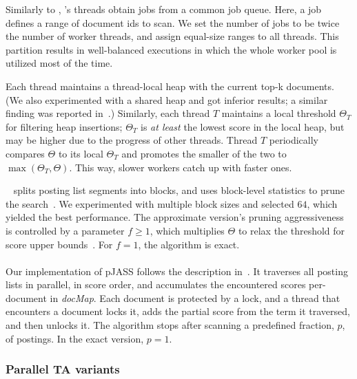 {Similarly to \alg, \pBMW's threads obtain jobs from a common job queue. Here, a job defines a range of document ids to scan. 
We set the number of jobs to be twice the number of worker threads, and assign equal-size ranges to all threads.  
This partition results in well-balanced executions in which the whole worker pool is utilized 
most of the time. 

Each thread maintains a thread-local heap with the current top-k documents. (We also experimented with a shared heap and 
got inferior results; a similar finding was reported in~\cite{rojas2013distributing}.)
Similarly, each thread $T$ maintains a local threshold $\Theta_T$ for filtering heap insertions; 
$\Theta_T$ is \emph{at least} the lowest score in the local heap, but may be higher due to the progress of other threads.  
Thread $T$ periodically compares $\Theta$ to its local $\Theta_T$ and promotes the smaller of the two to $\max(\Theta_T, \Theta)$. 
This way,  slower workers catch up with  faster ones.

\pBMW\
splits posting list segments into blocks, and uses block-level
statistics to prune the search~\cite{Ding:2011}. We experimented with multiple block sizes and selected $64$, 
which yielded the best performance.
The approximate version's pruning aggressiveness is  controlled by  a parameter 
$f \geq 1$, which multiplies $\Theta$ to relax the threshold for score upper bounds~\cite{Broder:2003}. For $f=1$, the algorithm is exact.

\paragraph{\pJASS}
Our implementation of pJASS  follows the description in~\cite{parallel-jass}. It traverses all posting lists in parallel, in score order, and accumulates the encountered scores 
per-document in  \emph{docMap}. Each document is protected by a lock, and a thread that encounters a document locks it, adds the partial score from the term it traversed, and then unlocks it.
The algorithm stops after scanning a predefined fraction, $p$,  of postings. In the exact version, $p=1$.


\subsubsection{Parallel TA variants}

}
